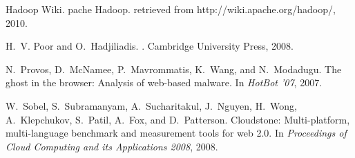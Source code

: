 \documentclass{acm_proc_article-sp}
\begin{document}
\begin{thebibliography}{10}
{Hadoop Wiki}.
pache {H}adoop.
\newblock retrieved from http://wiki.apache.org/hadoop/, 2010.

H.~V. Poor and O.~Hadjiliadis.
.
\newblock Cambridge University Press, 2008.

N.~Provos, D.~McNamee, P.~Mavrommatis, K.~Wang, and N.~Modadugu.
\newblock The ghost in the browser: Analysis of web-based malware.
\newblock In {\em HotBot '07}, 2007.

W.~Sobel, S.~Subramanyam, A.~Sucharitakul, J.~Nguyen, H.~Wong, A.~Klepchukov,
  S.~Patil, A.~Fox, and D.~Patterson.
\newblock Cloudstone: Multi-platform, multi-language benchmark and measurement
  tools for web 2.0.
\newblock In {\em Proceedings of Cloud Computing and its Applications 2008},
  2008.

\end{thebibliography}
\end{document}
